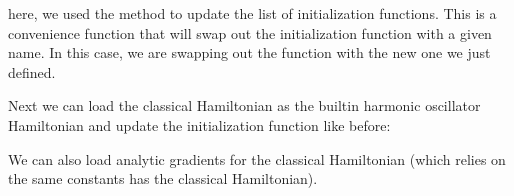 \documentclass[letterpaper,10pt,english]{sphinxmanual}
\begin{document}
\sphinxAtStartPar
here, we used the  method to update the list of initialization functions. This is a convenience function that will swap out the initialization function
with a given name. In this case, we are swapping out the  function with the new one we just defined.

\sphinxAtStartPar
Next we can load the classical Hamiltonian as the built\sphinxhyphen{}in harmonic oscillator Hamiltonian and update the initialization function like before:

\begin{sphinxVerbatim}[commandchars=\\\{\}]
 
       
      

  
  
  
\end{sphinxVerbatim}

\sphinxAtStartPar
We can also load analytic gradients for the classical Hamiltonian (which relies
on the same constants has the classical Hamiltonian).

\begin{sphinxVerbatim}[commandchars=\\\{\}]
  
\end{sphinxVerbatim}
\end{document}
